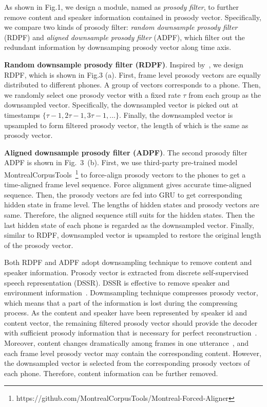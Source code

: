 \documentclass{article}
\begin{document}
As shown in Fig.1,  we design a module, named as \textit{prosody filter}, to further remove content and speaker information contained in prosody vector. Specifically, we compare two kinds of prosody filter: \textit{random downsample prosody filter} (RDPF) and \textit{aligned downsample prosody filter} (ADPF), which filter out the redundant information by downsamping prosody vector along time axis. 


\textbf{Random downsample prosody filter (RDPF)}. Inspired by~\cite{dai2021information},  we design RDPF, which is shown in Fig.3 (a). First, frame level prosody vectors are equally distributed to different phones. A group of vectors corresponds to a phone. Then, we randomly select one prosody vector with a fixed rate $\tau$ from each group as the downsampled vector. Specifically, the downsampled vector is picked out at timestamps $\{\tau-1, 2\tau-1, 3\tau-1, ...\}$. Finally, the downsampled vector is upsampled to form filtered prosody vector, the length of which is the same as prosody vector.


\textbf{Aligned downsample prosody filter (ADPF)}. The second prosody filter ADPF is shown in Fig.~3~(b). First, we use third-party pre-trained model MontrealCorpusTools~\footnote{https://github.com/MontrealCorpusTools/Montreal-Forced-Aligner} to force-align  prosody vectors to the phones to get a time-aligned frame level sequence. Force alignment gives accurate time-aligned sequence.  Then, the prosody vectors are fed into GRU to get corresponding hidden state in frame level. The lengths of hidden states and prosody vectors are same. Therefore, the aligned sequence still suits for the hidden states. Then the last hidden state of each phone is regarded as the downsampled vector. Finally, similar to RDPF, downsampled vector is upsampled to restore the original length of the prosody vector. 


Both RDPF and ADPF adopt downsampling technique to remove content and speaker information. Prosody vector is extracted from discrete self-supervised speech representation (DSSR). DSSR is effective to remove  speaker and environment information~\cite{huang2021any, 2019Unsupervised}. Dowmsampling technique compresses prosody vector, which means that a part of the information is lost during the compressing process. As the content and speaker have been represented  by speaker id and content vector, the remaining filtered prosody vector should provide the decoder with sufficient prosody information that is necessary for perfect reconstruction~\cite{qian2019autovc}. Moreover, content changes dramatically among frames in one utterance~\cite{chou2019one}, and each frame level prosody vector may contain the corresponding content. However, the downsampled vector is selected from the corresponding prosody vectors of each phone. Therefore, content information can be further removed.
\end{document}
